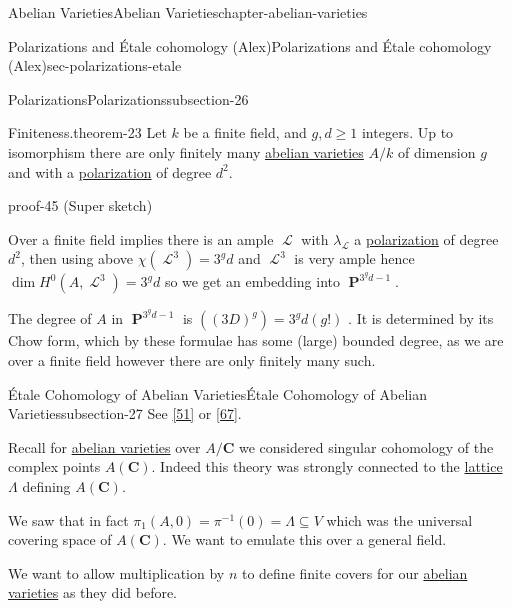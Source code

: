 \documentclass[oneside,10pt,]{book}
\numberwithin{equation}{section}
\newcommand{\sheaf}[1]{\operatorname{\mathcal{#1}}}
\newcommand{\CC}{\mathbf{C}}
\DeclareMathOperator{\PP}{\mathbf{P}}
\begin{document}
\begin{chapterptx}{Abelian Varieties}{}{Abelian Varieties}{}{}{chapter-abelian-varieties}
\begin{sectionptx}{Polarizations and Étale cohomology (Alex)}{}{Polarizations and Étale cohomology (Alex)}{}{}{sec-polarizations-etale}
\begin{subsectionptx}{Polarizations}{}{Polarizations}{}{}{subsection-26}
\begin{theorem}{Finiteness.}{}{theorem-23}%
\hypertarget{p-258}{}%
Let \(k\) be a finite field, and   \(g,d\ge 1\) integers. Up to isomorphism there are only finitely many \hyperref[def-buntes-abvar]{abelian varieties} \(A/k\) of dimension \(g\) and with a \hyperref[def-c-pol]{polarization} of degree \(d^2\).%
\end{theorem}
\begin{proofptx}{}{proof-45}
\hypertarget{p-259}{}%
(Super sketch)%
\par
\hypertarget{p-260}{}%
Over a finite field implies there is an ample \(\sheaf L\) with \(\lambda_{\sheaf L}\) a \hyperref[def-c-pol]{polarization} of degree \(d^2\), then using above \(\chi(\sheaf L^3) = 3^g d\) and \(\sheaf L^3\) is very ample hence \(\dim H^0(A, \sheaf L^3) = 3^g d\) so we get an embedding into \(\PP^{3^g d - 1}\).%
\par
\hypertarget{p-261}{}%
The degree of \(A\) in \(\PP^{3^g d - 1}\) is \(((3D)^g) = 3^g d(g!)\) . It is determined by its Chow form, which by these formulae has some (large) bounded degree, as we are over a finite field however there are only finitely many such.%
\end{proofptx}
\end{subsectionptx}
%
%
\typeout{************************************************}
\typeout{************************************************}
%
\begin{subsectionptx}{Étale Cohomology of Abelian Varieties}{}{Étale Cohomology of Abelian Varieties}{}{}{subsection-27}
\hypertarget{p-262}{}%
See \hyperlink{bib-milne-etale}{[51]} or \hyperlink{bib-tamme}{[67]}.%
\par
\hypertarget{p-263}{}%
Recall for \hyperref[def-buntes-abvar]{abelian varieties} over \(A/\CC\) we considered singular cohomology of the complex points \(A(\CC)\). Indeed this theory was strongly connected to the \hyperref[def-buntes-lattice]{lattice} \(\Lambda\) defining \(A(\CC)\).%
\par
\hypertarget{p-264}{}%
We saw that in fact \(\pi_1(A,0) = \pi^{-1} (0) = \Lambda \subseteq V\) which was the universal covering space of \(A(\CC)\). We want to emulate this over a general field.%
\par
\hypertarget{p-265}{}%
We want to allow multiplication by \(n\) to define finite covers for our \hyperref[def-buntes-abvar]{abelian varieties} as they did before.%
\par
\hypertarget{p-266}{}%

\end{subsectionptx}
\end{sectionptx}
\end{chapterptx}
\end{document}
